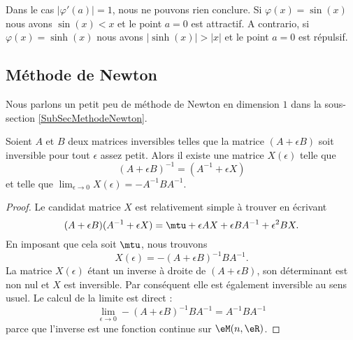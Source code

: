 \begin{remark}
    Dans le cas \(| \varphi'(a) |=1\), nous ne pouvons rien conclure. Si \( \varphi(x)=\sin(x)\) nous avons \( \sin(x)<x\) et le point \( a=0\) est attractif. A contrario, si \( \varphi(x)=\sinh(x)\) nous avons \( |\sinh(x)|>|x|\) et le point \( a=0\) est répulsif.
\end{remark}

\subsection{Méthode de Newton}
Nous parlons un petit peu de méthode de Newton en dimension \( 1\) dans la sous-section \ref{SubSecMethodeNewton}.

\begin{lemma}       \label{LemXdObnV}
    Soient \( A\) et \( B\) deux matrices inversibles telles que la matrice \( (A+\epsilon B)\) soit inversible pour tout \( \epsilon\) assez petit. Alors il existe une matrice \( X(\epsilon)\) telle que
    \begin{equation}
        (A+\epsilon B)^{-1}=(A^{-1}+\epsilon X)
    \end{equation}
    et telle que \( \lim_{\epsilon\to 0}X(\epsilon)=-A^{-1} BA^{-1}\).
\end{lemma}

\begin{proof}
    Le candidat matrice \( X\) est relativement simple à trouver en écrivant
    \begin{equation}
        (A+\epsilon B)(A^{-1}+\epsilon X)=\mtu+\epsilon AX+\epsilon BA^{-1}+\epsilon^2BX.
    \end{equation}
    En imposant que cela soit \( \mtu\), nous trouvons
    \begin{equation}
        X(\epsilon)=-(A+\epsilon B)^{-1} BA^{-1}.
    \end{equation}
    La matrice \( X(\epsilon)\) étant un inverse à droite de \( (A+\epsilon B)\), son déterminant est non nul et \( X\) est inversible. Par conséquent elle est également inversible au sens usuel. Le calcul de la limite est direct :
    \begin{equation}
        \lim_{\epsilon\to 0}-(A+\epsilon B)^{-1} BA^{-1}=A^{-1} BA^{-1}
    \end{equation}
    parce que l'inverse est une fonction continue sur \( \eM(n,\eR)\).
\end{proof}

